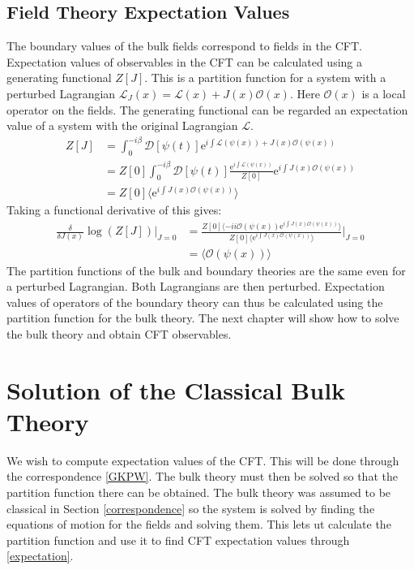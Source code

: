 \documentclass[12pt]{report}
\newcommand{\e}{\ensuremath{\mathrm{e}}}
\renewcommand{\L}{\ensuremath{\mathcal{L}}}
\renewcommand{\i}{\ensuremath{i}}
\begin{document}
\section{Field Theory Expectation Values}
The boundary values of the bulk fields correspond to fields in the CFT. Expectation values of observables in the CFT can be calculated using a generating functional $Z[J]$. This is a partition function for a system with a perturbed Lagrangian $\L_J(x)=\L(x)+J(x)\mathcal{O}(x)$. Here $\mathcal{O}(x)$ is a local operator on the fields. The generating functional can be regarded an expectation value of a system with the original Lagrangian $\L$.
\begin{equation}
\begin{split}
 Z[J]&=\int_0^{-\i\beta} \mathcal{D}[\psi(t)]\e^{\i \int \L(\psi(x))+J(x)\mathcal{O}(\psi(x))}\\
&=Z[0]\int_0^{-\i\beta} \mathcal{D}[\psi(t)]\frac{\e^{\i\int \L(\psi(x))}}{Z[0]}\e^{\i\int J(x)\mathcal{O}(\psi(x))}\\
&=Z[0]\langle\e^{\i\int J(x)\mathcal{O}(\psi(x))}\rangle
\end{split}
\end{equation}
Taking a functional derivative of this gives:
\begin{equation}
\begin{split}
 \frac{\delta}{\delta J(x)}\log(Z[J])|_{J=0}&=\frac{Z[0]\langle-\i\i \mathcal{O}(\psi(x))\e^{\i\int J(x)\mathcal{O}(\psi(x))}\rangle}{  Z[0]\langle\e^{\i \int J(x)\mathcal{O}(\psi(x))}\rangle }\big |_{J=0}\\
&= \langle \mathcal{O}(\psi(x))\rangle\label{expectation}
\end{split}
\end{equation}
The partition functions of the bulk and boundary theories are the same even for a perturbed Lagrangian. Both Lagrangians are then perturbed. Expectation values of operators of the boundary theory can thus be calculated using the partition function for the bulk theory. %
The next chapter will show how to solve the bulk theory and obtain CFT observables.
\chapter{Solution of the Classical Bulk Theory}
We wish to compute expectation values of the CFT. This will be done through the correspondence \eqref{GKPW}. The bulk theory must then be solved so that the partition function there can be obtained. The bulk theory was assumed to be classical in Section \ref{correspondence} so the system is solved by finding the equations of motion for the fields and solving them. This lets ut calculate the partition function and use it to find CFT expectation values through \ref{expectation}.
\end{document}

